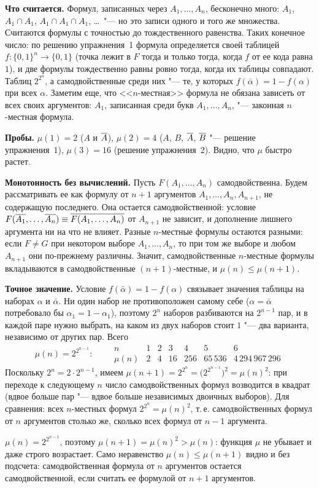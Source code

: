 \begin{solution}[5 (\S\,3)]
\textbf{Что считается.} Формул, записанных через $A_1,\dots,A_n$,
бесконечно много: $A_1$, $A_1\cap A_1$, $A_1\cap A_1\cap A_1$, \dots\ "--- но
это записи одного и того же множества. Считаются формулы с точностью до
тождественного равенства. Таких конечное число: по решению упражнения~1
формула определяется своей таблицей $f\colon\{0,1\}^n\to\{0,1\}$ (точка лежит
в $F$ тогда и только тогда, когда $f$ от ее кода равна $1$), и две формулы
тождественно равны ровно тогда, когда их таблицы совпадают. Таблиц
$2^{2^n}$, а самодвойственные среди них "--- те, у которых
$f(\bar\alpha)=1-f(\alpha)$ при всех $\alpha$. Заметим еще, что <<$n$-местная>>
формула не обязана зависеть от всех своих аргументов: $A_1$, записанная
среди букв $A_1,\dots,A_n$, "--- законная $n$-местная формула.

\textbf{Пробы.} $\mu(1)=2$ ($A$ и $\overline{A}$), $\mu(2)=4$ ($A$, $B$, $\overline{A}$,
$\overline{B}$ "--- решение упражнения~1), $\mu(3)=16$ (решение упражнения~2).
Видно, что $\mu$ быстро растет.

\textbf{Монотонность без вычислений.} Пусть $F(A_1,\dots,A_n)$
самодвойственна. Будем рассматривать ее как формулу от $n+1$ аргументов
$A_1,\dots,A_n,A_{n+1}$, не содержащую последнего. Она остается
самодвойственной: условие
$F(\overline{A_1},\dots,\overline{A_n})\equiv\overline{F(A_1,\dots,A_n)}$ от $A_{n+1}$ не зависит,
и дополнение лишнего аргумента ни на что не влияет. Разные $n$-местные
формулы остаются разными: если $F\ne G$ при некотором выборе
$A_1,\dots,A_n$, то при том же выборе и любом $A_{n+1}$ они по-прежнему
различны. Значит, самодвойственные $n$-местные формулы вкладываются в
самодвойственные $(n+1)$-местные, и $\mu(n)\le\mu(n+1)$.

\textbf{Точное значение.} Условие $f(\bar\alpha)=1-f(\alpha)$ связывает
значения таблицы на наборах $\alpha$ и $\bar\alpha$. Ни один набор не
противоположен самому себе ($\alpha=\bar\alpha$ потребовало бы
$\alpha_1=1-\alpha_1$), поэтому $2^n$ наборов разбиваются на $2^{n-1}$ пар,
и в каждой паре нужно выбрать, на каком из двух наборов стоит $1$ "--- два
варианта, независимо от других пар. Всего
\[
\mu(n)=2^{2^{n-1}}:\qquad
\begin{array}{c|cccccc}
n&1&2&3&4&5&6\\\hline
\mu(n)&2&4&16&256&65\,536&4\,294\,967\,296
\end{array}
\]
Поскольку $2^n=2\cdot2^{n-1}$, имеем $\mu(n+1)=2^{2^n}=\bigl(2^{2^{n-1}}\bigr)^2
=\mu(n)^2$: при переходе к следующему $n$ число самодвойственных формул
возводится в квадрат (вдвое больше пар "--- вдвое больше независимых
двоичных выборов). Для сравнения: всех $n$-местных формул
$2^{2^n}=\mu(n)^2$, т.\,е. самодвойственных формул от $n$ аргументов
столько же, сколько всех формул от $n-1$ аргумента.

\answer $\mu(n)=2^{2^{n-1}}$, поэтому $\mu(n+1)=\mu(n)^2>\mu(n)$: функция
$\mu$ не убывает и даже строго возрастает. Само неравенство
$\mu(n)\le\mu(n+1)$ видно и без подсчета: самодвойственная формула от $n$
аргументов остается самодвойственной, если считать ее формулой от $n+1$
аргументов.
\end{solution}

